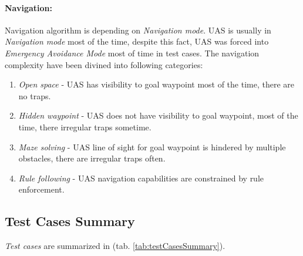 \paragraph{Navigation:} Navigation algorithm is depending on \emph{Navigation mode}. UAS is usually in \emph{Navigation mode} most of the time, despite this fact, UAS was forced into \emph{Emergency Avoidance Mode} most of time in test cases. The navigation complexity have been divined into following categories:

\begin{enumerate}
    \item \emph{Open space} - UAS has visibility to goal waypoint most of the time, there are no traps.
    \item \emph{Hidden waypoint} - UAS does not have visibility to goal waypoint, most of the time, there irregular traps sometime.
    \item \emph{Maze solving} - UAS line of sight for goal waypoint is hindered by multiple obstacles, there are irregular traps often.
    \item \emph{Rule following} - UAS navigation capabilities are constrained by rule enforcement.
\end{enumerate}

\subsection{Test Cases Summary}\label{s:testCaseSummary}

\noindent \emph{Test cases} are summarized in (tab. \ref{tab:testCasesSummary}).

